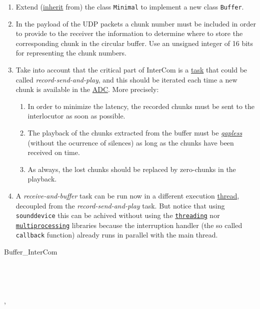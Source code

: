 \begin{enumerate}
\item Extend
  (\href{https://en.wikipedia.org/wiki/Inheritance_(object-oriented_programming)}{inherit}
  from) the class \texttt{Minimal} to implement a new class
  \texttt{Buffer}.
\item In the payload of the UDP packets a chunk number must be
  included in order to provide to the receiver the information to
  determine where to store the corresponding chunk in the circular
  buffer. Use an unsigned integer of 16 bits for representing the
  chunk numbers.
\item Take into account that the critical part of InterCom is a
  \href{https://en.wikipedia.org/wiki/Task_(computing)}{task} that
  could be called \emph{record-send-and-play}, and this should be
  iterated each time a new chunk is available in the
  \href{https://en.wikipedia.org/wiki/Analog-to-digital_converter}{ADC}. More
  precisely:
  \begin{enumerate}
  \item In order to minimize the latency, the recorded chunks must be
    sent to the interlocutor as soon as possible.
  \item The playback of the chunks extracted from the buffer must be
    \href{https://en.wikipedia.org/wiki/Gapless_playback}{\emph{gapless}}
    (without the ocurrence of silences) as long as the chunks have
    been received on time.
  \item As always, the lost chunks should be replaced by zero-chunks
    in the playback.
  \end{enumerate}
\item A \emph{receive-and-buffer} task can be run now in a different
  execution
  \href{https://en.wikipedia.org/wiki/Thread_(computing)}{thread},
  decoupled from the \emph{record-send-and-play} task. But notice that
  using \texttt{sounddevice} this can be achived without using the
  \href{https://docs.python.org/3/library/threading.html}{\texttt{threading}}
  nor
  \href{https://docs.python.org/3/library/multiprocessing.html}{\texttt{multiprocessing}}
  libraries because the interruption handler (the so called
  \texttt{callback} function) already runs in parallel with the main
  thread.
\end{enumerate}

\begin{pseudocode}{Buffer\_InterCom}{~}
  \BEGIN
     \GETS {}\\
     \GETS {}\\
    \\
     \GETS {}\\
  \END
  \ENDPROCEDURE
  \BEGIN
     \GETS {}\\
    ,  \GETS {}\\
  \END
  \ENDPROCEDURE
\end{pseudocode}


